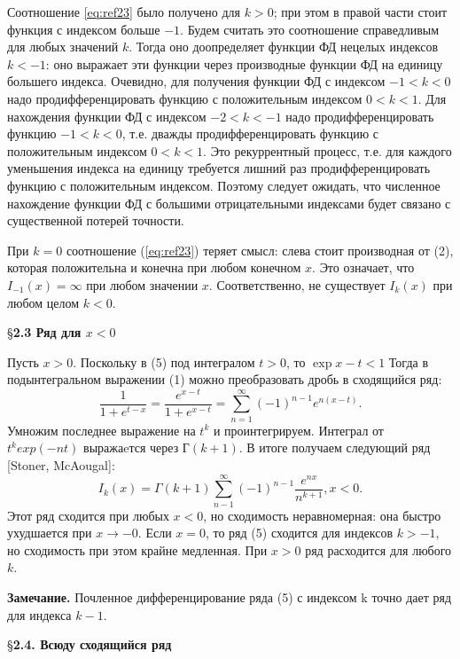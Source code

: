 Соотношение \ref{eq:ref23} было получено для $k > 0$; при этом в правой части стоит
функция с индексом больше $-1$. Будем считать это соотношение справедливым
для любых значений $k$. Тогда оно доопределяет функции ФД нецелых индексов
$k < -1$: оно выражает эти функции через производные функции ФД на единицу
большего индекса. Очевидно, для получения функции ФД с индексом $-1 < k < 0$
надо продифференцировать функцию с положительным индексом $0 < k < 1$. Для
нахождения функции ФД с индексом $-2 < k < -1$ надо продифференцировать
функцию $-1< k < 0$, т.е. дважды продифференцировать функцию с
положительным индексом $0 < k < 1$. Это рекуррентный процесс, т.е. для
каждого уменьшения индекса на единицу требуется лишний раз
продифференцировать функцию с положительным индексом. Поэтому следует
ожидать, что численное нахождение функции ФД с большими отрицательными
индексами будет связано с существенной потерей точности.

При $k = 0$ соотношение (\ref{eq:ref23}) теряет смысл: слева стоит производная от (2),
которая положительна и конечна при любом конечном $x$. Это означает, что
$I_{-1}(x) = \infty$ при любом значении $x$. Соответственно, не существует $I_k(x)$ при
любом целом $k < 0$.


\S \textbf{2.3 Ряд для $x < 0$}


Пусть $x > 0$. Поскольку в (5) под интегралом $t > 0$, то $\exp{x-t} < 1$ Тогда в
подынтегральном выражении (1) можно преобразовать дробь в сходящийся
ряд:
\begin{equation}
\frac{1}{1+e^{t-x}} = \frac{e^{x-t}}{1+e^{x-t}}=\sum_{n=1}^{\infty} (-1)^{n-1}e^{n(x-t)}.
\end{equation}
Умножим последнее выражение на $t^k$ и проинтегрируем. Интеграл от
$t^{k}exp(-nt)$ выражаeтся через $Г(k + 1)$. В итоге получаем следующий ряд [Stoner, McAougal]:
\begin{equation}
I_k(x)=\Gamma(k+1)\sum_{n-1}^{\infty} (-1)^{n-1}\frac{e^{nx}}{n^{k+1}},x<0.
\end{equation}
Этот ряд сходится при любых $x < 0$, но сходимость неравномерная: она быстро
ухудшается при $x \to -0$. Если $x = 0$, то ряд (5) сходится для индексов $k > -1$, но
сходимость при этом крайне медленная. При $x > 0$ ряд расходится для любого
$k$.

\textbf{Замечание.} Почленное дифференцирование ряда (5) с индексом k точно
дает ряд для индекса $k - 1$.


\S \textbf{2.4. Всюду сходящийся ряд}

